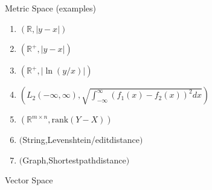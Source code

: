 \documentclass{beamer}
\begin{document}
\begin{frame}{Metric Space (examples)}
\begin{enumerate}
\item $(\mathbb{R},|y-x|)$
\item $(\mathbb{R}^+,|y-x|)$
\item $(\mathbb{R}^+,|\ln(y/x)|)$
\item $\left( L_2(-\infty,\infty),\sqrt{\int_{-\infty}^\infty (f_1(x)-f_2(x))^2 dx}\right)$
\item $(\mathbb{R}^{m\times n},\text{rank}(Y-X))$
\item $($String,Levenshtein/editdistance$)$
\item $($Graph,Shortestpathdistance$)$
\end{enumerate}
\end{frame}

\begin{frame}{Vector Space}

\end{frame}
\end{document}
